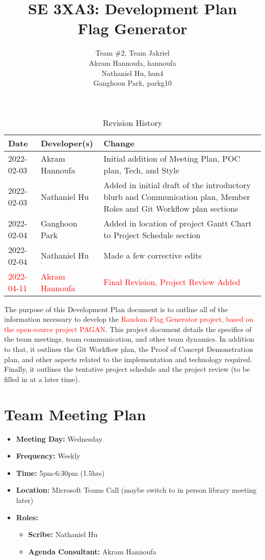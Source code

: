 \documentclass{article}
\title{SE 3XA3: Development Plan\\Flag Generator}
\author{Team \#2, Team Jakriel
		\\ Akram Hannoufa, hannoufa
		\\ Nathaniel Hu, hun4
		\\ Ganghoon Park, parkg10
}
\date{}
\begin{document}
\begin{table}[hp]
\caption{Revision History} \label{TblRevisionHistory}
\begin{tabularx}{\textwidth}{llX}
\toprule
\textbf{Date} & \textbf{Developer(s)} & \textbf{Change}\\
\midrule
2022-02-03 & Akram Hannoufa & Initial addition of Meeting Plan, POC plan, Tech, and Style\\
2022-02-03 & Nathaniel Hu & Added in initial draft of the introductory blurb and Communication plan, Member Roles and Git Workflow plan sections\\
2022-02-04 & Ganghoon Park & Added in location of project Gantt Chart to Project Schedule section\\
2022-02-04 & Nathaniel Hu & Made a few corrective edits\\
\textcolor{red}{2022-04-11} & \textcolor{red}{Akram Hannoufa} & \textcolor{red}{Final Revision, Project Review Added}\\
\bottomrule
\end{tabularx}
\end{table}

\newpage

\maketitle

\noindent The purpose of this Development Plan document is to outline all of the information necessary to develop the \textcolor{red}{Random Flag Generator project, based on the open-source project PAGAN}. This project document details the specifics of the team meetings, team communication, and other team dynamics. In addition to that, it outlines the Git Workflow plan, the Proof of Concept Demonstration plan, and other aspects related to the implementation and technology required. Finally, it outlines the tentative project schedule and the project review (to be filled in at a later time).

\section{Team Meeting Plan}
\begin{itemize}
	\item \textbf{Meeting Day:} Wednesday
	\item \textbf{Frequency:} Weekly
	\item \textbf{Time:} 5pm-6:30pm (1.5hrs)
	\item \textbf{Location:} Microsoft Teams Call (maybe switch to in person library meeting later)
	\item \textbf{Roles:} 
	\begin{itemize}
		\item \textbf{Scribe: } Nathaniel Hu 
		\item \textbf{Agenda Consultant: } Akram Hannoufa
	\end{itemize}
\end{itemize}
\end{document}
